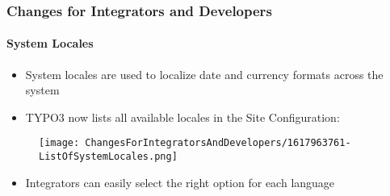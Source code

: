 %

\begin{frame}[fragile]
	\frametitle{Changes for Integrators and Developers}
	\framesubtitle{System Locales}

	\begin{itemize}
		\item System locales are used to localize date and currency formats across the system
		\item TYPO3 now lists all available locales in the Site Configuration:
	\end{itemize}

	\begin{figure}
		\texttt{[image: ChangesForIntegratorsAndDevelopers/1617963761-ListOfSystemLocales.png]}
	\end{figure}

	\begin{itemize}
		\item Integrators can easily select the right option for each language
	\end{itemize}

\end{frame}


